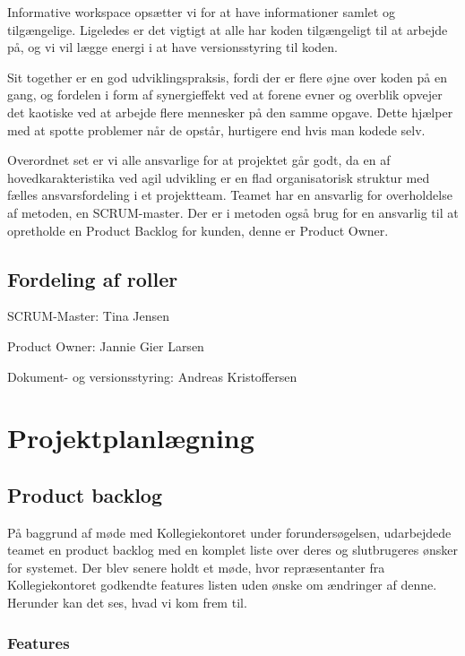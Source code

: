 \documentclass[12pt, a4paper]{report}
\begin{document}
Informative workspace opsætter vi for at have informationer samlet og tilgængelige. Ligeledes er det vigtigt at alle har koden tilgængeligt til at arbejde på, og vi vil lægge energi i at have versionsstyring til koden.

Sit together er en god udviklingspraksis, fordi der er flere øjne over koden på en gang, og fordelen i form af synergieffekt ved at forene evner og overblik opvejer det kaotiske ved at arbejde flere mennesker på den samme opgave. Dette hjælper med at spotte problemer når de opstår, hurtigere end hvis man kodede selv.

Overordnet set er vi alle ansvarlige for at projektet går godt, da en af hovedkarakteristika ved agil udvikling er en flad organisatorisk struktur med fælles ansvarsfordeling i et projektteam. Teamet har en ansvarlig for overholdelse af metoden, en SCRUM-master. Der er i metoden også brug for en ansvarlig til at opretholde en Product Backlog for kunden, denne er Product Owner.

\subsection{Fordeling af roller}

SCRUM-Master: Tina Jensen \newline

Product Owner: Jannie Gier Larsen \newline

Dokument- og versionsstyring: Andreas Kristoffersen \newline


\section{Projektplanlægning}

\subsection{Product backlog}

På baggrund af møde med Kollegiekontoret under forundersøgelsen, udarbejdede teamet en product backlog med en komplet liste over deres og slutbrugeres ønsker for systemet. Der blev senere holdt et møde, hvor repræsentanter fra Kollegiekontoret godkendte features listen uden ønske om ændringer af denne. Herunder kan det ses, hvad vi kom frem til.

\subsubsection{Features}
\end{document}
